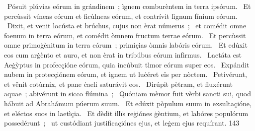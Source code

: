 {~Pósuit plúvias eórum in grándinem~; ìgnem comburèntem in terra ipsórum.
~Et percùssit víneas eórum et ficùlneas eórum, et contrívit lìgnum fínium eórum.
~Dixit, et venit locústa et brúchus, cujus non èrat númerus~;
~et comédit omne foenum in terra eórum, et comédit òmnem fructum terrae eórum.
~Et percùssit omne primoġènitum in terra eórum~; primìçias òmnis labóris eórum.
~Et edúxit eos cum arġènto et auro, et non èrat in tribúbus eórum infìrmus.
~Laetáta est Aeġỳptus in profecçióne eórum, quia incúbuit tìmor eórum super eos.
~Expándit nubem in protecçiónem eórum, et ìgnem ut luċéret eïs per nòctem.
~Petivérunt, et vënit cotùrnix, et pane ċaeli saturávit eos.
~Dirúpit pètram, et fluxérunt aquae~; abivérunt in sicco flúmina~;
~Quóniam mèmor fuit vèrbi sancti sui, quod hábuit ad Abrahámum púerum suum.
~Et edúxit pòpulum suum in exsultaçióne, et eléctos suos in laetìçia.
~Et dèdit illïs reġiónes ġèntium, et labóres populórum possedérunt~;
~ut custódiant justificaçiónes ejus, et leġem ejus requírant.
}
{14}{3}
